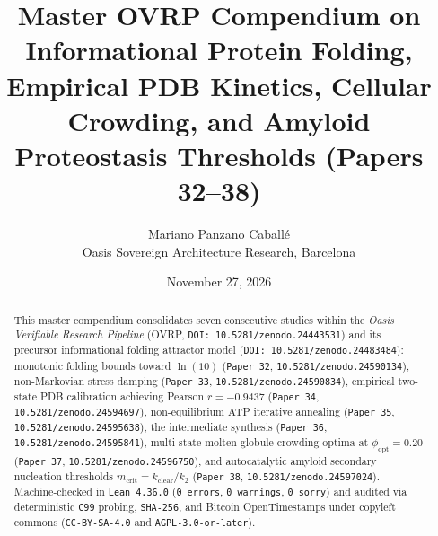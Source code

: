 \documentclass[11pt,a4paper]{article}
\title{Master OVRP Compendium on Informational Protein Folding, Empirical PDB Kinetics, Cellular Crowding, and Amyloid Proteostasis Thresholds (Papers 32--38)}
\author{Mariano Panzano Caball\'e \\ \small Oasis Sovereign Architecture Research, Barcelona}
\date{November 27, 2026}
\begin{document}
\maketitle

\begin{abstract}
This master compendium consolidates seven consecutive studies within the \emph{Oasis Verifiable Research Pipeline} (OVRP, \texttt{DOI: 10.5281/zenodo.24443531}) and its precursor informational folding attractor model (\texttt{DOI: 10.5281/zenodo.24483484}): monotonic folding bounds toward $\ln(10)$ (\texttt{Paper~32}, \texttt{10.5281/zenodo.24590134}), non-Markovian stress damping (\texttt{Paper~33}, \texttt{10.5281/zenodo.24590834}), empirical two-state PDB calibration achieving Pearson $r = -0.9437$ (\texttt{Paper~34}, \texttt{10.5281/zenodo.24594697}), non-equilibrium ATP iterative annealing (\texttt{Paper~35}, \texttt{10.5281/zenodo.24595638}), the intermediate synthesis (\texttt{Paper~36}, \texttt{10.5281/zenodo.24595841}), multi-state molten-globule crowding optima at $\phi_{\mathrm{opt}} = 0.20$ (\texttt{Paper~37}, \texttt{10.5281/zenodo.24596750}), and autocatalytic amyloid secondary nucleation thresholds $m_{\mathrm{crit}} = k_{\mathrm{clear}} / k_2$ (\texttt{Paper~38}, \texttt{10.5281/zenodo.24597024}). Machine-checked in \texttt{Lean~4.36.0} (\texttt{0~errors}, \texttt{0~warnings}, \texttt{0~sorry}) and audited via deterministic \texttt{C99} probing, \texttt{SHA-256}, and Bitcoin OpenTimestamps under copyleft commons (\texttt{CC-BY-SA-4.0} and \texttt{AGPL-3.0-or-later}).
\end{abstract}
\end{document}
